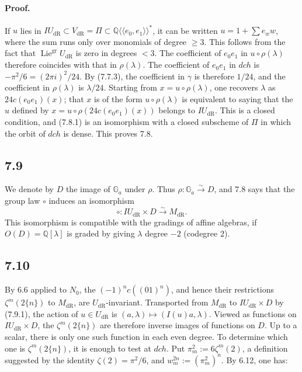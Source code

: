 \documentclass[10pt]{article}
\newcommand{\Q}{\mathbb Q}
\newcommand{\Ga}{\mathbb G_a}
\newcommand{\Lie}{\operatorname{Lie}}
\newcommand{\dR}{\mathrm{dR}}
\begin{document}
\paragraph{Proof.}
If $u$ lies in $IU_{\dR}\subset V_{\dR}=\Pi\subset\Q\langle\!\langle e_0,e_1\rangle\!\rangle^*$, it can be written $u=1+\sum e_w w$, where the sum runs only over monomials of degree $\geq3$. This follows from the fact that $\Lie^{\mathrm{gr}}U_{\dR}$ is zero in degrees $<3$. The coefficient of $e_0e_1$ in $u\circ\rho(\lambda)$ therefore coincides with that in $\rho(\lambda)$. The coefficient of $e_0e_1$ in $dch$ is $-\pi^2/6=(2\pi i)^2/24$. By (7.7.3), the coefficient in $\gamma$ is therefore $1/24$, and the coefficient in $\rho(\lambda)$ is $\lambda/24$. Starting from $x=u\circ\rho(\lambda)$, one recovers $\lambda$ as $24c(e_0e_1)(x)$; that $x$ is of the form $u\circ\rho(\lambda)$ is equivalent to saying that the $u$ defined by $x=u\circ\rho(24c(e_0e_1)(x))$ belongs to $IU_{\dR}$. This is a closed condition, and (7.8.1) is an isomorphism with a closed subscheme of $\Pi$ in which the orbit of $dch$ is dense. This proves 7.8.

\subsection*{7.9}
We denote by $D$ the image of $\Ga$ under $\rho$. Thus $\rho:\Ga\overset{\sim}{\to}D$, and 7.8 says that the group law $\circ$ induces an isomorphism
\begin{equation}
\circ:IU_{\dR}\times D\overset{\sim}{\longrightarrow}M_{\dR}.
\tag{7.9.1}
\end{equation}
This isomorphism is compatible with the gradings of affine algebras, if $O(D)=\Q[\lambda]$ is graded by giving $\lambda$ degree $-2$ (codegree $2$).

\subsection*{7.10}
By 6.6 applied to $N_0$, the $(-1)^n c((01)^n)$, and hence their restrictions $\zeta^m(2\{n\})$ to $M_{\dR}$, are $U_{\dR}$-invariant. Transported from $M_{\dR}$ to $IU_{\dR}\times D$ by (7.9.1), the action of $u\in U_{\dR}$ is $(a,\lambda)\mapsto(I(u)a,\lambda)$. Viewed as functions on $IU_{\dR}\times D$, the $\zeta^m(2\{n\})$ are therefore inverse images of functions on $D$. Up to a scalar, there is only one such function in each even degree. To determine which one is $\zeta^m(2\{n\})$, it is enough to test at $dch$. Put $\pi_m^2:=6\zeta^m(2)$, a definition suggested by the identity $\zeta(2)=\pi^2/6$, and $w_m^{2n}:=(\pi_m^2)^n$. By 6.12, one has:
\end{document}
